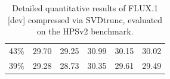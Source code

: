 \begin{table}[H]
{\begin{tabular}{cccccc}
			43\% &    %
			29.70 &    %
			29.25 &    %
			30.99 &    %
			30.15 &    %
			30.02     %
			\\
			39\% &    %
			29.28 &    %
			28.73 &    %
			30.35 &    %
			29.61 &    %
			29.49    %
			\\
			\bottomrule
		\end{tabular}
	}
	\smallskip
	\caption[\gls{SVD}trunc on FLUX.1 {[dev]}: Detailed HPSv2 Results]{Detailed quantitative results of FLUX.1 {[dev]} compressed via \gls{SVD}trunc, evaluated on the HPSv2 benchmark.}
	\label{tab:sup_hps}
\end{table}

